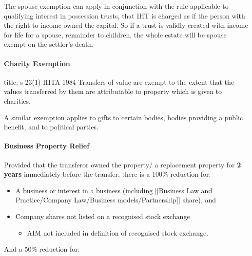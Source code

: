 \documentclass[
]{article}
\newenvironment{Shaded}{}{}
\newcommand{\NormalTok}[1]{#1}
\providecommand{\tightlist}{%
  \setlength{\itemsep}{0pt}\setlength{\parskip}{0pt}}
\begin{document}
The spouse exemption can apply in conjunction with the rule applicable
to qualifying interest in possession trusts, that IHT is charged as if
the person with the right to income owned the capital. So if a trust is
validly created with income for life for a spouse, remainder to
children, the whole estate will be spouse exempt on the settlor's death.

\hypertarget{charity-exemption}{%
\paragraph{Charity Exemption}\label{charity-exemption}}

\begin{Shaded}
\begin{Highlighting}[]
\NormalTok{title: s 23(1) IHTA 1984}
\NormalTok{Transfers of value are exempt to the extent that the values transferred by them are attributable to property which is given to charities.}
\end{Highlighting}
\end{Shaded}

A similar exemption applies to gifts to certain bodies, bodies providing
a public benefit, and to political parties.

\hypertarget{business-property-relief}{%
\paragraph{Business Property Relief}\label{business-property-relief}}

Provided that the transferor owned the property/ a replacement property
for \textbf{2 years} immediately before the transfer, there is a 100\%
reduction for:

\begin{itemize}
\tightlist
\item
  A business or interest in a business (including {[}{[}Business Law and
  Practice/Company Law/Business models/Partnership{]}{]} share), and
\item
  Company shares not listed on a recognised stock exchange

  \begin{itemize}
  \tightlist
  \item
    AIM not included in definition of recognised stock exchange.
  \end{itemize}
\end{itemize}

And a 50\% reduction for:
\end{document}
